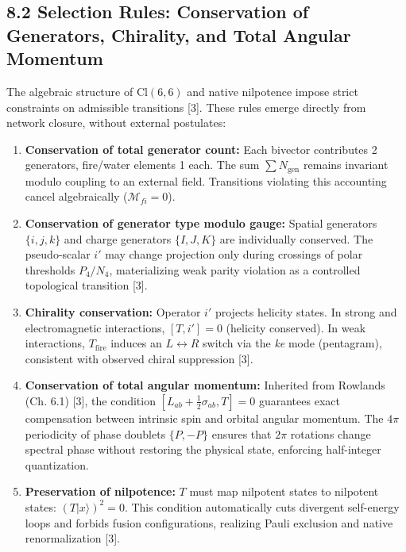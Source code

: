 \documentclass[11pt]{article}
\providecommand{\tightlist}{\setlength{\itemsep}{2pt}\setlength{\parskip}{6pt}}
\let\oldmathcal\mathcal
\renewcommand{\mathcal}[1]{\oldmathcal{#1}}
\providecommand{\tightlist}{%
  \setlength{\itemsep}{2pt}\setlength{\parskip}{6pt}
}
\begin{document}
\hypertarget{selection-rules-conservation-of-generators-chirality-and-total-angular-momentum}{%
\subsection{8.2 Selection Rules: Conservation of Generators, Chirality,
and Total Angular
Momentum}\label{selection-rules-conservation-of-generators-chirality-and-total-angular-momentum}}

The algebraic structure of \(\text{Cl}(6,6)\) and native nilpotence
impose strict constraints on admissible transitions {[}3{]}. These rules
emerge directly from network closure, without external postulates:

\begin{enumerate}
\def\labelenumi{\arabic{enumi}.}
\tightlist
\item
  \textbf{Conservation of total generator count:} Each bivector
  contributes 2 generators, fire/water elements 1 each. The sum
  \(\sum N_{\text{gen}}\) remains invariant modulo coupling to an
  external field. Transitions violating this accounting cancel
  algebraically (\(\mathcal{M}_{fi}=0\)).
\item
  \textbf{Conservation of generator type modulo gauge:} Spatial
  generators \(\{i,j,k\}\) and charge generators \(\{I,J,K\}\) are
  individually conserved. The pseudo-scalar \(i'\) may change projection
  only during crossings of polar thresholds \(P_4/N_4\), materializing
  weak parity violation as a controlled topological transition {[}3{]}.
\item
  \textbf{Chirality conservation:} Operator \(i'\) projects helicity
  states. In strong and electromagnetic interactions, \([T, i'] = 0\)
  (helicity conserved). In weak interactions, \(T_{\text{fire}}\)
  induces an \(L \leftrightarrow R\) switch via the \textit{ke} mode
  (pentagram), consistent with observed chiral suppression {[}3{]}.
\item
  \textbf{Conservation of total angular momentum:} Inherited from
  Rowlands (Ch. 6.1) {[}3{]}, the condition
  \([L_{ab} + \frac{1}{2}\sigma_{ab}, T] = 0\) guarantees exact
  compensation between intrinsic spin and orbital angular momentum. The
  \(4\pi\) periodicity of phase doublets \(\{P, -P\}\) ensures that
  \(2\pi\) rotations change spectral phase without restoring the
  physical state, enforcing half-integer quantization.
\item
  \textbf{Preservation of nilpotence:} \(T\) must map nilpotent states
  to nilpotent states: \((T|x\rangle)^2 = 0\). This condition
  automatically cuts divergent self-energy loops and forbids fusion
  configurations, realizing Pauli exclusion and native renormalization
  {[}3{]}.
\end{enumerate}
\end{document}
